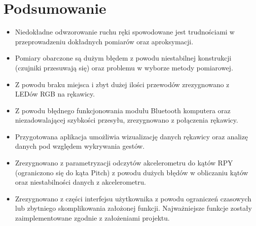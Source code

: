 \documentclass[10pt,a4paper]{article}
\begin{document}


\section{Podsumowanie}
\begin{itemize}
\item Niedokładne odwzorowanie ruchu ręki spowodowane jest trudnościami w przeprowadzeniu dokładnych pomiarów oraz aproksymacji.
\item Pomiary obarczone są dużym błędem z powodu niestabilnej konstrukcji (czujniki przesuwają się) oraz problemu w wyborze metody pomiarowej.
\item Z powodu braku miejsca i zbyt dużej ilości przewodów zrezygnowano z LEDów RGB na rękawicy.
\item Z powodu błędnego funkcjonowania modułu Bluetooth komputera oraz niezadowalającej szybkości przesyłu, zrezygnowano z połączenia rękawicy.
\item Przygotowana aplikacja umożliwia wizualizację danych rękawicy oraz analizę danych pod względem wykrywania gestów.
\item Zrezygnowano z parametryzacji odczytów akcelerometru do kątów RPY (ograniczono się do kąta Pitch) z powodu dużych błędów w obliczaniu kątów oraz niestabilności danych z akcelerometru.
\item Zrezygnowano z części interfejsu użytkownika z powodu ograniczeń czasowych lub zbytniego skomplikowania założonej funkcji. Najważniejsze funkcje zostały zaimplementowane zgodnie z założeniami projektu.
\end{itemize}
\end{document}
